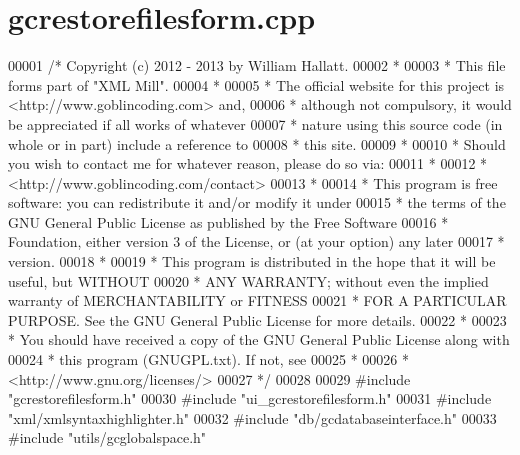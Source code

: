 \hypertarget{gcrestorefilesform_8cpp_source}{\section{gcrestorefilesform.\-cpp}
}

\begin{DoxyCode}
00001 \textcolor{comment}{/* Copyright (c) 2012 - 2013 by William Hallatt.}
00002 \textcolor{comment}{ *}
00003 \textcolor{comment}{ * This file forms part of "XML Mill".}
00004 \textcolor{comment}{ *}
00005 \textcolor{comment}{ * The official website for this project is <http://www.goblincoding.com> and,}
00006 \textcolor{comment}{ * although not compulsory, it would be appreciated if all works of whatever}
00007 \textcolor{comment}{ * nature using this source code (in whole or in part) include a reference to}
00008 \textcolor{comment}{ * this site.}
00009 \textcolor{comment}{ *}
00010 \textcolor{comment}{ * Should you wish to contact me for whatever reason, please do so via:}
00011 \textcolor{comment}{ *}
00012 \textcolor{comment}{ *                 <http://www.goblincoding.com/contact>}
00013 \textcolor{comment}{ *}
00014 \textcolor{comment}{ * This program is free software: you can redistribute it and/or modify it
       under}
00015 \textcolor{comment}{ * the terms of the GNU General Public License as published by the Free
       Software}
00016 \textcolor{comment}{ * Foundation, either version 3 of the License, or (at your option) any later}
00017 \textcolor{comment}{ * version.}
00018 \textcolor{comment}{ *}
00019 \textcolor{comment}{ * This program is distributed in the hope that it will be useful, but WITHOUT}
00020 \textcolor{comment}{ * ANY WARRANTY; without even the implied warranty of MERCHANTABILITY or
       FITNESS}
00021 \textcolor{comment}{ * FOR A PARTICULAR PURPOSE.  See the GNU General Public License for more
       details.}
00022 \textcolor{comment}{ *}
00023 \textcolor{comment}{ * You should have received a copy of the GNU General Public License along with}
00024 \textcolor{comment}{ * this program (GNUGPL.txt).  If not, see}
00025 \textcolor{comment}{ *}
00026 \textcolor{comment}{ *                    <http://www.gnu.org/licenses/>}
00027 \textcolor{comment}{ */}
00028 
00029 \textcolor{preprocessor}{#include "gcrestorefilesform.h"}
00030 \textcolor{preprocessor}{#include "ui\_gcrestorefilesform.h"}
00031 \textcolor{preprocessor}{#include "xml/xmlsyntaxhighlighter.h"}
00032 \textcolor{preprocessor}{#include "db/gcdatabaseinterface.h"}
00033 \textcolor{preprocessor}{#include "utils/gcglobalspace.h"}

\end{DoxyCode}
